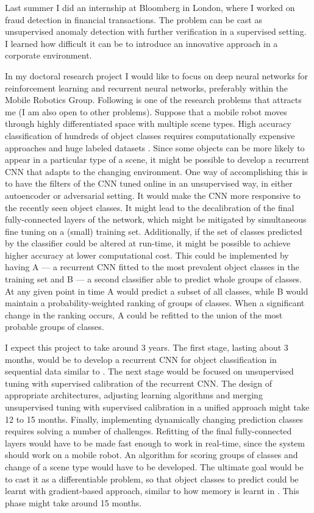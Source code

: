 \documentclass[12pt]{article}
\begin{document}
Last summer I did an internship at Bloomberg in London, where I worked on fraud detection in financial transactions. The problem can be cast as unsupervised anomaly detection with further verification in a supervised setting. I learned how difficult it can be to introduce an innovative approach in a corporate environment.

In my doctoral research project I would like to focus on deep neural networks for reinforcement learning and recurrent neural networks, preferably within the Mobile Robotics Group. Following is one of the research problems that attracts me (I am also open to other problems). Suppose that a mobile robot moves through highly differentiated space with multiple scene types. High accuracy classification of hundreds of object classes requires computationally expensive approaches and huge labeled datasets \cite{imagenet}. Since some objects can be more likely to appear in a particular type of a scene, it might be possible to develop a recurrent CNN that adapts to the changing environment. One way of accomplishing this is to have the filters of the CNN tuned online in an unsupervised way, in either autoencoder \cite{autoencoders} or adversarial \cite{adversarial} setting. It would make the CNN more responsive to the recently seen object classes. It might lead to the decalibration of the final fully-connected layers of the network, which might be mitigated by simultaneous fine tuning on a (small) training set. Additionally, if the set of classes predicted by the classifier could be altered at run-time, it might be possible to achieve higher accuracy at lower computational cost. This could be implemented by having A --- a recurrent CNN fitted to the most prevalent object classes in the training set and B --- a second classifier able to predict whole groups of classes. At any given point in time A would predict a subset of all classes, while B would maintain a probability-weighted ranking of groups of classes. When a significant change in the ranking occurs, A could be refitted to the union of the most probable groups of classes. 

I expect this project to take around 3 years. The first stage, lasting about 3 months, would be to develop a recurrent CNN for object classification in sequential data similar to \cite{rcnn}. The next stage would be focused on unsupervised tuning with supervised calibration of the recurrent CNN. The design of appropriate architectures, adjusting learning algorithms and merging unsupervised tuning with supervised calibration in a unified approach might take 12 to 15 months. Finally, implementing dynamically changing prediction classes requires solving a number of challenges. Refitting of the final fully-connected layers would have to be made fast enough to work in real-time, since the system should work on a mobile robot. An algorithm for scoring groups of classes and change of a scene type would have to be developed. The ultimate goal would be to cast it as a differentiable problem, so that object classes to predict could be learnt with gradient-based approach, similar to how memory is learnt in \cite{memory}. This phase might take around 15 months.
\end{document}
